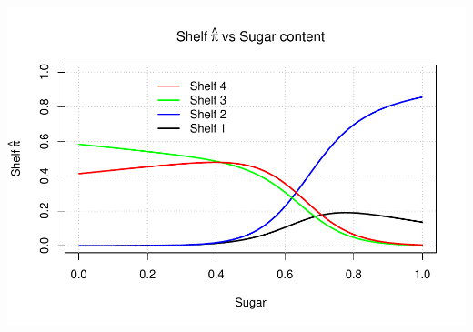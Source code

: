 \documentclass[11pt,]{article}
\begin{document}
\includegraphics{HeatherFeinstein_DavidHarding_CharlotteSwavola.Rmd_files/figure-latex/unnamed-chunk-11-1.pdf}
\end{document}
